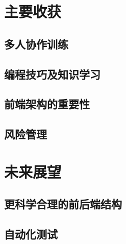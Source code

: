 \documentclass[a4paper,12pt]{article}
\begin{document}
    \section{主要收获} %
    \label{sec:主要收获}
    \subsection{多人协作训练} %
    \label{sub:多人协作训练}
    
    \subsection{编程技巧及知识学习} %
    \label{sub:编程技巧及知识学习}
    
    \subsection{前端架构的重要性} %
    \label{sub:前端架构的重要性}
    
    \subsection{风险管理} %
    \label{sub:风险管理}
    
    \section{未来展望} %
    \label{sec:未来展望}
    \subsection{更科学合理的前后端结构} %
    \label{sub:更科学合理的前后端结构}
    
    \subsection{自动化测试} %
    \label{sub:自动化测试}
    
    \label{applastpage}
    \newpage
    
    
\iffalse
\begin{itemize}[noitemsep,topsep=0pt]
\end{itemize}
\begin{enumerate}[label=\Roman{*}.,noitemsep,topsep=0pt]
\end{enumerate}
\begin{multicols}{2}
\end{multicols}
\fi
\end{document}
